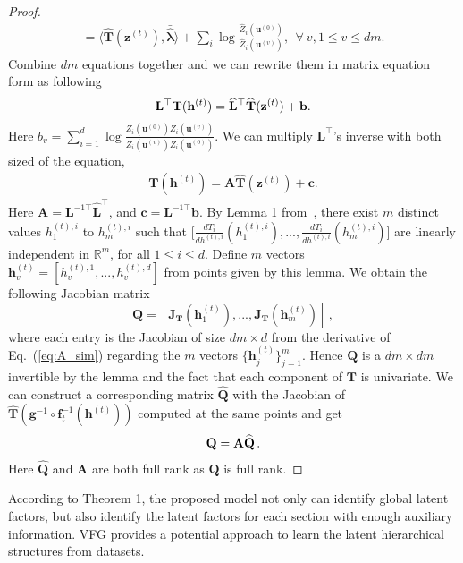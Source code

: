 \documentclass{article}
\begin{document}
\begin{proof}
\begin{align}
=\langle \widehat{\mathbf{T}}(\mathbf{z}^{(t)}), \bar{\widehat{\mathbf{\lambda}}}	\rangle + \sum_i\log \frac{\widehat{Z}_i(\mathbf{u}^{(0)})}{\widehat{Z}_i(\mathbf{u}^{(v)})}, \ \ \forall \ v, 1 \leqslant v \leqslant dm .
\end{align}
Combine $dm$ equations together and we can rewrite them in matrix equation form as following
\begin{align} \notag
\mathbf{L}^{\top}\mathbf{T}(\mathbf{h}^{(t)}) = \widehat{\mathbf{L}}^{\top}\widehat{\mathbf{T}}(\mathbf{z}^{(t)}) + \mathbf{b}.
\end{align}
Here $b_v=\sum_{i=1}^{d}\log \frac{\widehat{Z}_i(\mathbf{u}^{(0)}) Z_i(\mathbf{u}^{(v)}) }{\widehat{Z}_i(\mathbf{u}^{(v)}) Z_i(\mathbf{u}^{(0)}) }$. We can multiply $\mathbf{L}^{\top}$'s inverse with both sized of the equation, 
\begin{align}\label{eq:A_sim}
\mathbf{T}(\mathbf{h}^{(t)}) = \mathbf{A}\widehat{\mathbf{T}}(\mathbf{z}^{(t)}) + \mathbf{c}.
\end{align}
Here $\mathbf{A} = \mathbf{L}^{-1\top} \widehat{\mathbf{L}}^{\top} $, and $\mathbf{c} = \mathbf{L}^{-1\top} \mathbf{b}$. 
By Lemma 1 from~\cite{Khemakhem20a}, there exist $m$ distinct values $h^{(t),i}_{1}$ to $h^{(t),i}_{m}$ such that $\big[ \frac{d T_i}{ d h^{(t),i}}(h^{(t),i}_{1}), ...,  \frac{d T_i}{ d h^{(t),i}}(h^{(t),i}_{m}) \big]$ are linearly independent in $\mathbb{R}^m$, for all $1\leqslant i \leqslant d$. 
Define $m$ vectors $\mathbf{h}^{(t)}_{v}= [h^{(t),1}_v, ..., h^{(t),d}_v]$ from points given by this lemma. 
We obtain the following Jacobian matrix
$$\mathbf{Q}= [\mathbf{J}_{\mathbf{T}}(\mathbf{h}^{(t)}_1), ..., \mathbf{J}_{\mathbf{T}}(\mathbf{h}^{(t)}_m)] \, ,$$ 
where each entry is the Jacobian of size $dm \times d$ from the derivative of Eq.~(\ref{eq:A_sim}) regarding the $m$ vectors $\{\mathbf{h}^{(t)}_j\}_{j=1}^m$. 
Hence $\mathbf{Q}$ is a $dm \times dm$ invertible by the lemma and the fact that each component of $\mathbf{T}$ is univariate. %
We can construct a corresponding matrix $\widehat{\mathbf{Q}}$ with the Jacobian of $\widehat{\mathbf{T}}(\mathbf{g}^{-1}\circ \mathbf{f}_t^{-1}(\mathbf{h}^{(t)}))$ computed at the same points and get 
\begin{align} \notag
\mathbf{Q} = \mathbf{A}\widehat{\mathbf{Q}} \,.
\end{align}
Here $\widehat{\mathbf{Q}}$ and $\mathbf{A}$ are both full rank as $\mathbf{Q}$ is full rank.
\end{proof}

According to Theorem 1, the proposed model not only can identify global latent factors, but also identify the latent factors for each section with enough auxiliary information. 
VFG provides a potential approach to learn the latent hierarchical structures from datasets.
\end{document}
